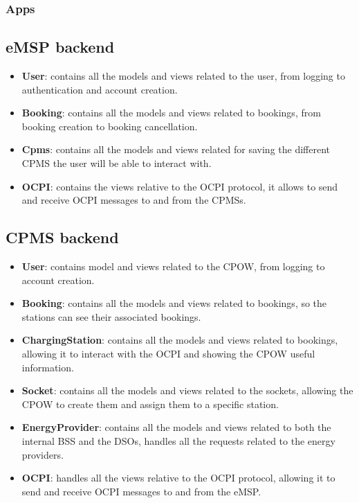 \documentclass[table, 12pt]{article}
\begin{document}
\subsubsection{Apps}
\subsection{eMSP backend}
\begin{itemize}
    \item \textbf{User}: contains all the models and views related to the user, from logging to authentication and account creation.
    \item \textbf{Booking}: contains all the models and views related to bookings, from booking creation to booking cancellation.
    \item \textbf{Cpms}: contains all the models and views related for saving the different CPMS the user will be able to interact with.
    \item \textbf{OCPI}: contains the views relative to the OCPI protocol, it allows to send and receive OCPI messages to and from the CPMSs.
\end{itemize}

\subsection{CPMS backend}
\begin{itemize}
    \item \textbf{User}: contains model and views related to the CPOW, from logging to account creation.
    \item \textbf{Booking}: contains all the models and views related to bookings, so the stations can see their associated bookings.
    \item \textbf{ChargingStation}: contains all the models and views related to bookings, allowing it to interact with the OCPI and showing the CPOW useful information.
    \item \textbf{Socket}: contains all the models and views related to the sockets, allowing the CPOW to create them and assign them to a specific station.
    \item \textbf{EnergyProvider}: contains all the models and views related to both the internal BSS and the DSOs, handles all the requests related to the energy providers.
    \item \textbf{OCPI}: handles all the views relative to the OCPI protocol, allowing it to send and receive OCPI messages to and from the eMSP.
\end{itemize}
\end{document}

